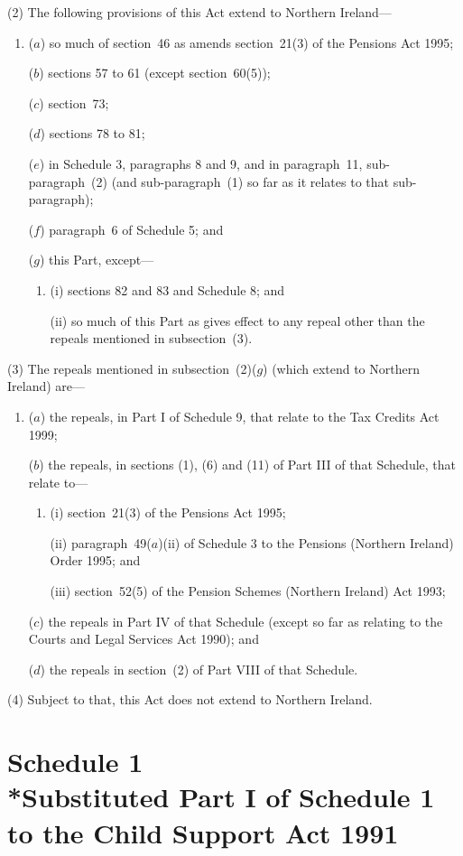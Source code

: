 \documentclass[12pt,a4paper]{article}
\begin{document}
(2) The following provisions of this Act extend to Northern Ireland—
\begin{enumerate}\item[]
($a$) so much of section~46 as amends section~21(3)  of the Pensions Act 1995;

($b$) sections 57 to 61 (except section~60(5));

($c$) section~73;

($d$) sections 78 to 81;

($e$) in Schedule 3, paragraphs 8 and 9, and in paragraph~11, sub-paragraph~(2)  (and sub-paragraph~(1)  so far as it relates to that sub-paragraph);

($f$) paragraph~6 of Schedule 5; and

($g$) this Part, except—
\begin{enumerate}\item[]
(i) sections 82 and 83 and Schedule 8; and

(ii) so much of this Part as gives effect to any repeal other than the repeals mentioned in subsection~(3).
\end{enumerate}
\end{enumerate}

(3) The repeals mentioned in subsection~(2)($g$)  (which extend to Northern Ireland) are—
\begin{enumerate}\item[]
($a$) the repeals, in Part I of Schedule 9, that relate to the Tax Credits Act 1999;

($b$) the repeals, in sections (1), (6)  and (11)  of Part III of that Schedule, that relate to—
\begin{enumerate}\item[]
(i) section~21(3)  of the Pensions Act 1995;

(ii) paragraph~49($a$)(ii)  of Schedule 3 to the Pensions (Northern Ireland) Order 1995; and

(iii) section~52(5)  of the Pension Schemes (Northern Ireland) Act 1993;
\end{enumerate}

($c$) the repeals in Part IV of that Schedule (except so far as relating to the Courts and Legal Services Act 1990); and

($d$) the repeals in section~(2)  of Part VIII of that Schedule.
\end{enumerate}

(4) Subject to that, this Act does not extend to Northern Ireland.

\part[Schedule 1 --- Substituted Part I of Schedule 1 to the Child Support Act 1991]{Schedule 1\\*Substituted Part I of Schedule 1 to the Child Support Act 1991}
\end{document}
